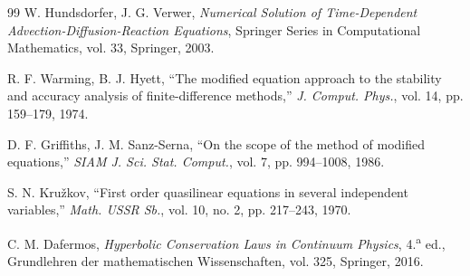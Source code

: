 \documentclass[11pt,letterpaper]{article}
\theoremstyle{plain}
\theoremstyle{definition}
\theoremstyle{remark}
\numberwithin{equation}{section}
\begin{document}
\begin{thebibliography}{99}
		W. Hundsdorfer, J. G. Verwer, \emph{Numerical Solution of Time-Dependent Advection-Diffusion-Reaction Equations}, Springer Series in Computational Mathematics, vol. 33, Springer, 2003.
		
		R. F. Warming, B. J. Hyett, ``The modified equation approach to the stability and accuracy analysis of finite-difference methods,'' \emph{J. Comput. Phys.}, vol. 14, pp. 159--179, 1974.
		
		D. F. Griffiths, J. M. Sanz-Serna, ``On the scope of the method of modified equations,'' \emph{SIAM J. Sci. Stat. Comput.}, vol. 7, pp. 994--1008, 1986.
		
		S. N. Kru\v{z}kov, ``First order quasilinear equations in several independent variables,'' \emph{Math. USSR Sb.}, vol. 10, no. 2, pp. 217--243, 1970.
		
		C. M. Dafermos, \emph{Hyperbolic Conservation Laws in Continuum Physics}, 4.\textsuperscript{a} ed., Grundlehren der mathematischen Wissenschaften, vol. 325, Springer, 2016.
		
	\end{thebibliography}
	
\end{document}
